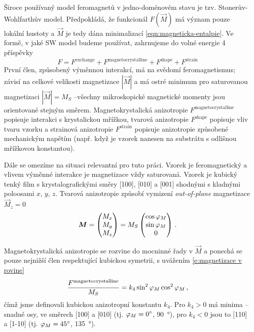 Široce používaný model feromagnetů v jedno-doménovém stavu je tzv. Stonerův-Wohlfarthův model.
Předpokládá, že funkcionál $F(\vec{M})$ má význam pouze lokální hustoty a $\vec{M}$ je tedy dána minimalizací \eqref{eqn:magneticka-entalpie}.
Ve formě, v jaké SW model budeme používat, zahrnujeme do volné energie 4 příspěvky
\begin{equation}
    F=F^\textrm{exchange} + F^\textrm{magnetocrystalline} + F^\textrm{shape} + F^\textrm{strain}
\end{equation}
První člen, způsobený výměnnou interakcí, má na svědomí feromagnetismus; závisí na celkové velikosti magnetizace $|\vec{M}|$ a má ostré minimum pro saturovanou magnetizaci $|\vec{M}|=M_S$ --\tododash všechny mikroskopické magnetické momenty jsou orientované stejným směrem.
Magnetokrystalická anizotropie $F^\textrm{magnetocrystalline}$ popisuje interakci s krystalickou mřížkou, tvarová anizotropie $F^\textrm{shape}$ popisuje vliv tvaru vzorku a strainová anizotropie $F^\textrm{strain}$ popisuje anizotropie způsobené mechanickým napětím (např. když je vzorek nanesen na substrátu s odlišnou mřížkovou konstantou).

Dále se omezíme na situaci relevantní pro tuto práci.
Vzorek je feromagnetický a vlivem výměnné interakce je magnetizace vždy saturovaná.
Vzorek je kubický tenký film s krystalografickými směry [100], [010] a [001] shodnými s kladnými poloosami $x$, $y$, $z$.
Tvarová anizotropie způsobí vymizení \emph{out-of-plane} magnetizace $\vec{M}_z=0$
\begin{equation}
\label{eqn:magnetizace-v-rovine}
    \bm{M}=\begin{pmatrix} M_x \\ M_y \\ M_z \end{pmatrix}
    = M_S \begin{pmatrix} \cos \varphi_M \\ \sin \varphi_M \\ 0 \end{pmatrix} \,.
\end{equation}

Magnetokrystalická anizotropie se rozvine do mocninné řady v $\vec{M}$ a ponechá se pouze nejnižší člen respektující kubickou symetrii, s uvážením \eqref{e:magnetizace v rovine}
\begin{equation}
    \frac{F^\textrm{magnetocrystalline}}{M_S}=k_4 \sin^2 \varphi_M \cos^2 \varphi_M \,,
\end{equation}
čímž jsme definovali kubickou anizotropní konstantu $k_4$.
Pro $k_4>0$ má minima --\tododash snadné osy, ve směrech [100] a [010] (tj. $\varphi_M=\SI{0}{\degree}$, \SI{90}{\degree}), pro $k_4<0$ jsou to [110] a [1-10] (tj. $\varphi_M=\SI{45}{\degree}$, \SI{135}{\degree}).

